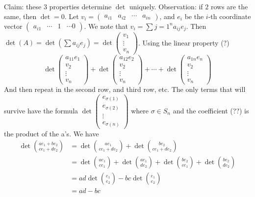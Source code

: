 \documentclass{article}
\theoremstyle{plain}
\theoremstyle{remark}
\begin{document}
Claim: these 3 properties determine $\det$ uniquely.
Observation: if $2$ rows are the same, then $\det = 0$.
Let $v_i = \begin{pmatrix} a_{i1} & a_{i2} & \cdots & a_{in} \end{pmatrix}$,
and $e_i$ be the $i$-th coordinate vector $\begin{pmatrix} a_{i1} & \cdots & 1 & \cdots 0 \end{pmatrix}$.
We note that $v_i = \sum{j=1}^n a_{ij}e_j$.
Then $\det(A) = \det(\sum a_{ij} e_j) = \det\begin{pmatrix} v_1 \\ \vdots \\ v_n \end{pmatrix}$.
Using the linear property (?)
\begin{equation}\label{funky det}
	\det\begin{pmatrix} a_{11}e_1 \\ v_2 \\ \vdots \\ v_n \end{pmatrix}
	+ \det\begin{pmatrix} a_{12}e_2 \\ v_2 \\ \vdots \\ v_n \end{pmatrix}
	+ \cdots +
	\det\begin{pmatrix} a_{1n}e_n \\ v_2 \\ \vdots \\ v_n \end{pmatrix}
\end{equation}
And then repeat in the second row, and third row, etc.
The only terms that will survive have the formula
$\det\begin{pmatrix} e_{\sigma(1)} \\ e_{\sigma(2)} \\ \vdots \\ e_{\sigma(n)} \end{pmatrix}$
where $\sigma \in S_n$ and the coefficient (??) is the product of the a's.
We have
\begin{align*}
	\det\binom{ae_1 + be_2}{ce_1+de_2}
	&= \det\binom{ae_1}{ce_1 + de_2} + \det\binom{be_2}{ce_1+de_2}\\
	&= \det\binom{ae_1}{ce_1} + \det\binom{ae_1}{de_2}
	+ \det\binom{be_2}{ce_1} + \det\binom{be_2}{de_2}\\
	&= ad\det\binom{e_1}{e_2} - bc\det\binom{e_1}{e_2}\\
	&= ad-bc
\end{align*}
\end{document}
